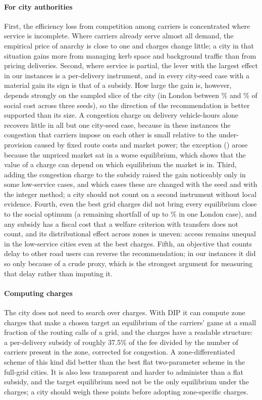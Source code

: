 \documentclass[preprint,12pt]{elsarticle}
\theoremstyle{definition}
\theoremstyle{remark}
\begin{document}
\paragraph{For city authorities} First, the efficiency loss from competition among carriers is concentrated where service is incomplete. Where carriers already serve almost all demand, the empirical price of anarchy is close to one and charges change little; a city in that situation gains more from managing kerb space and background traffic than from pricing deliveries. Second, where service is partial, the lever with the largest effect in our instances is a per-delivery instrument, and in every city-seed case with a material gain its sign is that of a subsidy. How large the gain is, however, depends strongly on the sampled slice of the city (in London between \EtwoLondonBothMin\% and \EtwoLondonBothMax\% of social cost across three seeds), so the direction of the recommendation is better supported than its size. A congestion charge on delivery vehicle-hours alone recovers little in all but one city-seed case, because in these instances the congestion that carriers impose on each other is small relative to the under-provision caused by fixed route costs and market power; the exception (\EtwoCongMaxCase) arose because the unpriced market sat in a worse equilibrium, which shows that the value of a charge can depend on which equilibrium the market is in. Third, adding the congestion charge to the subsidy raised the gain noticeably only in some low-service cases, and which cases these are changed with the seed and with the integer method; a city should not count on a second instrument without local evidence. Fourth, even the best grid charges did not bring every equilibrium close to the social optimum (a remaining shortfall of up to \PricedGapMax\% in one London case), and any subsidy has a fiscal cost that a welfare criterion with transfers does not count, and its distributional effect across zones is uneven: access remains unequal in the low-service cities even at the best charges. Fifth, an objective that counts delay to other road users can reverse the recommendation; in our instances it did so only because of a crude proxy, which is the strongest argument for measuring that delay rather than imputing it.

\paragraph{Computing charges} The city does not need to search over charges. With DIP it can compute zone charges that make a chosen target an equilibrium of the carriers' game at a small fraction of the routing calls of a grid, and the charges have a readable structure: a per-delivery subsidy of roughly 37.5\% of the fee divided by the number of carriers present in the zone, corrected for congestion. A zone-differentiated scheme of this kind did better than the best flat two-parameter scheme in the full-grid cities. It is also less transparent and harder to administer than a flat subsidy, and the target equilibrium need not be the only equilibrium under the charges; a city should weigh these points before adopting zone-specific charges.
\end{document}
